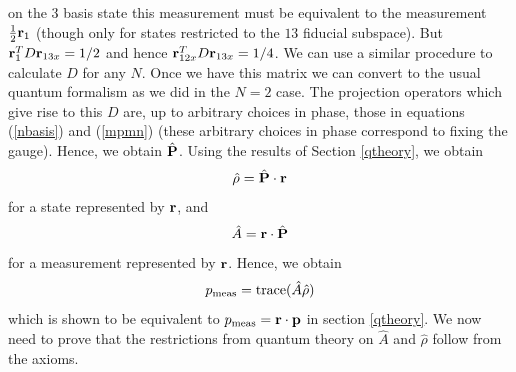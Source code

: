 \documentclass[12pt]{article}
\begin{document}
on the $3$ basis state this measurement must be equivalent to the
measurement ${1\over 2}{\bf r}_1$ (though only for states restricted to
the $13$ fiducial subspace).  But ${\bf r}_1^T D{\bf r}_{13x}=1/2$ and
hence ${\bf r}_{12x}^T D {\bf r}_{13x}=1/4$.
We can use a similar procedure to calculate $D$ for any $N$.  Once we
have this matrix we can convert to the usual quantum formalism as we did
in the $N=2$ case.  The projection operators which give rise to this $D$
are, up to arbitrary choices in phase, those in equations (\ref{nbasis})
and (\ref{mpmn}) (these arbitrary choices in phase correspond to fixing
the gauge).  Hence, we obtain $\hat{\bf P}$.
Using the results of Section \ref{qtheory}, we obtain
\begin{equation}\label{convertstate}
\hat{\rho}=\hat{\bf P}\cdot{\bf r}
\end{equation}
for a state represented by $\bf r$, and
\begin{equation}\label{convertmeas}
\hat{A}={\bf r}\cdot\hat{\bf P}
\end{equation}
for a measurement represented by $\bf r$.  Hence, we obtain
\begin{equation}
p_{\rm meas}={\rm trace}(\hat{A}\hat{\rho})
\end{equation}
which is shown to be equivalent to $p_{\rm meas}={\bf r}\cdot{\bf p}$ in
section \ref{qtheory}. We now need
to prove that the restrictions from quantum theory on $\hat{A}$ and
$\hat{\rho}$ follow from the axioms.
\end{document}
